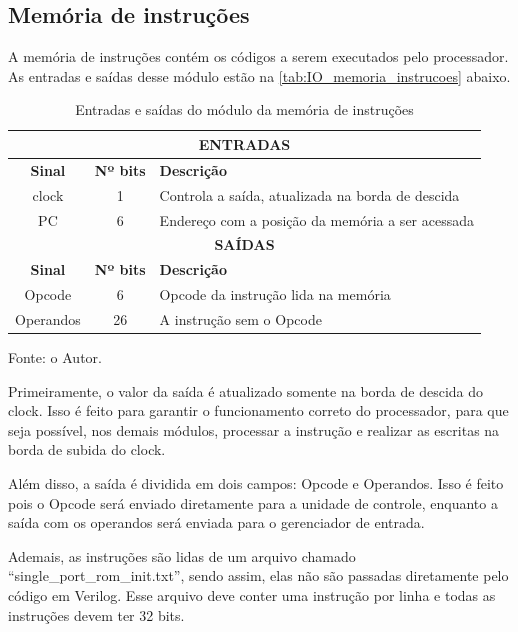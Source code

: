 \documentclass[
	12pt,				%
	oneside,
	a4paper,			%
	english,			%
	french,				%
	spanish,			%
	brazil,				%
	]{abntex2}
\begin{document}
\subsection{Memória de instruções}

A memória de instruções contém os códigos a serem executados pelo processador. As entradas e saídas desse módulo estão na \autoref{tab:IO_memoria_instrucoes} abaixo.

\setlength{\tabcolsep}{10pt} %
\begin{table}[H]
\centering
\caption{Entradas e saídas do módulo da memória de instruções}
\label{tab:IO_memoria_instrucoes}
\begin{tabular}{|c|c|l|}
\hline
\multicolumn{3}{|c|}{\textbf{ENTRADAS}} \\
\hline
\textbf{Sinal} & \textbf{Nº bits} & \textbf{Descrição} \\
\hline
clock & 1 & Controla a saída, atualizada na borda de descida \\
\hline
PC & 6 & Endereço com a posição da memória a ser acessada \\
\hline
\multicolumn{3}{|c|}{\textbf{SAÍDAS}} \\
\hline
\textbf{Sinal} & \textbf{Nº bits} & \textbf{Descrição} \\
\hline
Opcode & 6 & Opcode da instrução lida na memória \\
\hline
Operandos & 26 & A instrução sem o Opcode \\
\hline
\end{tabular}
\vspace{-0.5em}
\begin{center}
Fonte: o Autor.
\end{center}
\end{table} 

Primeiramente, o valor da saída é atualizado somente na borda de descida do clock. Isso é feito para garantir o funcionamento correto do processador, para que seja possível, nos demais módulos, processar a instrução e realizar as escritas na borda de subida do clock.

Além disso, a saída é dividida em dois campos: Opcode e Operandos. Isso é feito pois o Opcode será enviado diretamente para a unidade de controle, enquanto a saída com os operandos será enviada para o gerenciador de entrada.

Ademais, as instruções são lidas de um arquivo chamado ``single\_port\_rom\_init.txt'', sendo assim, elas não são passadas diretamente pelo código em Verilog. Esse arquivo deve conter uma instrução por linha e todas as instruções devem ter 32 bits.
\end{document}
